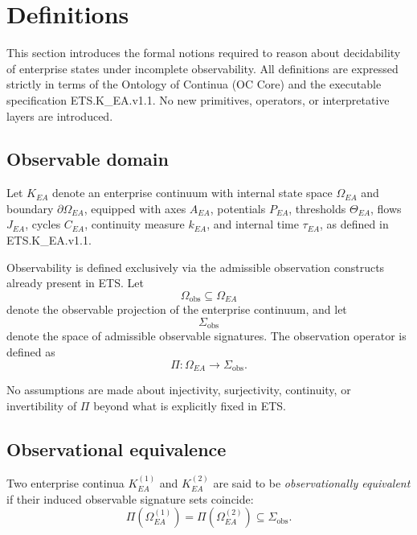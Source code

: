 \section{Definitions}
\label{sec:definitions}

This section introduces the formal notions required to reason about
decidability of enterprise states under incomplete observability.
All definitions are expressed strictly in terms of the Ontology of
Continua (OC Core) and the executable specification
ETS.K\_EA.v1.1. No new primitives, operators, or interpretative layers
are introduced.

\subsection{Observable domain}
\label{subsec:observable-domain}

Let $K_{EA}$ denote an enterprise continuum with internal state space
$\Omega_{EA}$ and boundary $\partial\Omega_{EA}$, equipped with axes
$A_{EA}$, potentials $P_{EA}$, thresholds $\Theta_{EA}$, flows $J_{EA}$,
cycles $C_{EA}$, continuity measure $k_{EA}$, and internal time
$\tau_{EA}$, as defined in ETS.K\_EA.v1.1.

Observability is defined exclusively via the admissible observation
constructs already present in ETS. Let
\[
\Omega_{\mathrm{obs}} \subseteq \Omega_{EA}
\]
denote the observable projection of the enterprise continuum, and let
\[
\Sigma_{\mathrm{obs}}
\]
denote the space of admissible observable signatures. The observation
operator is defined as
\[
\Pi : \Omega_{EA} \to \Sigma_{\mathrm{obs}}.
\]

No assumptions are made about injectivity, surjectivity, continuity, or
invertibility of $\Pi$ beyond what is explicitly fixed in ETS.

\subsection{Observational equivalence}
\label{subsec:observational-equivalence}

\begin{definition}
Two enterprise continua $K_{EA}^{(1)}$ and $K_{EA}^{(2)}$ are said to be
\emph{observationally equivalent} if their induced observable signature
sets coincide:
\[
\Pi\!\left(\Omega_{EA}^{(1)}\right)
=
\Pi\!\left(\Omega_{EA}^{(2)}\right)
\subseteq \Sigma_{\mathrm{obs}}.
\]
\end{definition}

